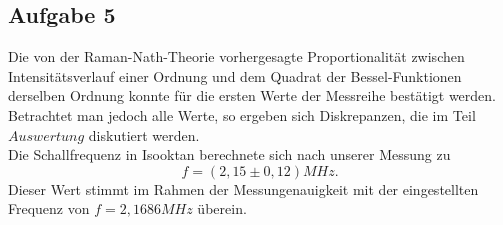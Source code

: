 \subsection{Aufgabe 5}
Die von der Raman-Nath-Theorie vorhergesagte Proportionalität zwischen Intensitätsverlauf einer Ordnung und dem Quadrat der Bessel-Funktionen derselben Ordnung konnte für die ersten Werte der Messreihe bestätigt werden. Betrachtet man jedoch alle Werte, so ergeben sich Diskrepanzen, die im Teil $ Auswertung$ diskutiert werden.\\
Die Schallfrequenz in Isooktan berechnete sich nach unserer Messung zu \[f=(2,15\pm0,12) MHz.\] Dieser Wert stimmt im Rahmen der Messungenauigkeit mit der eingestellten Frequenz von $f=2,1686 MHz$ überein.